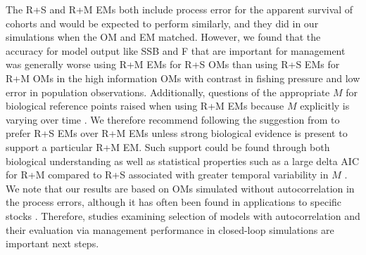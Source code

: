 \documentclass[
  12pt,
]{article}
\begin{document}
The R+S and R+M EMs both include process error for the apparent survival
of cohorts and would be expected to perform similarly, and they did in
our simulations when the OM and EM matched. However, we found that the
accuracy for model output like SSB and F that are important for
management was generally worse using R+M EMs for R+S OMs than using R+S
EMs for R+M OMs in the high information OMs with contrast in fishing
pressure and low error in population observations. Additionally,
questions of the appropriate \(M\) for biological reference points
raised when using R+M EMs because \(M\) explicitly is varying over time
\citep[e.g.,][]{legaultpalmer16}. We therefore recommend following the
suggestion from \citet{lietal24} to prefer R+S EMs over R+M EMs unless
strong biological evidence is present to support a particular R+M EM.
Such support could be found through both biological understanding
\citep[e.g.,][]{trijouletetal20} as well as statistical properties such
as a large delta AIC for R+M compared to R+S associated with greater
temporal variability in \(M\) \citep{milleretal26}. We note that our
results are based on OMs simulated without autocorrelation in the
process errors, although it has often been found in applications to
specific stocks \citep[e.g.,][]{cadigan16, stocketal21}. Therefore,
studies examining selection of models with autocorrelation and their
evaluation via management performance in closed-loop simulations are
important next steps.
\end{document}
